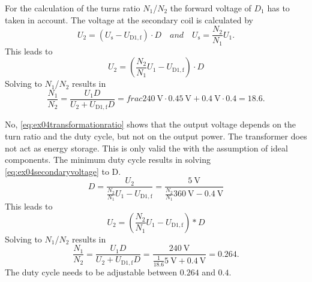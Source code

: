 \begin{solutionblock}
    For the calculation of the turns ratio $N_\mathrm{1}$/$N_\mathrm{2}$ the forward voltage of $D_\mathrm{1}$ has to taken in account.
    The voltage at the secondary coil is calculated by
    \begin{equation}
        U_\mathrm{2}=\left(U_\mathrm{s}-U_\mathrm{D1,f}\right)\cdot D \quad and \quad 
        U_\mathrm{s}=\frac{N_\mathrm{2}}{N_\mathrm{1}}U_\mathrm{1}.
        \label{eq:ex04transformationratio}        
    \end{equation}
    This leads to
    \begin{equation}
        U_\mathrm{2}=\left(\frac{N_\mathrm{2}}{N_\mathrm{1}}U_\mathrm{1}-U_\mathrm{D1,f}\right)\cdot D
        \label{eq:ex04secondaryvoltage}  
    \end{equation}
    Solving to $N_\mathrm{1}$/$N_\mathrm{2}$ results in
    \begin{equation}
        \frac{N_\mathrm{1}}{N_\mathrm{2}}=\frac{U_\mathrm{1}D}{U_\mathrm{2}+ U_\mathrm{D1,f}D}
        =frac{\SI{240}{\volt}\cdot 0.4}{\SI{5}{\volt}+\SI{0.4}{\volt} \cdot 0.4 }=18.6.
    \end{equation}
\end{solutionblock}



\begin{solutionblock}
    No, \eqref{eq:ex04transformationratio} shows that the output voltage depends on the turn ratio and the duty cycle,
    but not on the output power. The transformer does not act as energy storage. 
    This is only valid the with the assumption of ideal components. 
    The minimum duty cycle results in solving \eqref{eq:ex04secondaryvoltage} to D.
    \begin{equation}
        D=\frac{U_\mathrm{2}}{\frac{N_\mathrm{2}}{N_\mathrm{1}}U_\mathrm{1}-U_\mathrm{D1,f}}=
        \frac{\SI{5}{\volt}}{\frac{N_\mathrm{2}}{N_\mathrm{1}}\SI{360}{\volt}-\SI{0.4}{\volt}}
    \end{equation}
    This leads to
    \begin{equation}
        U_\mathrm{2}=\left(\frac{N_\mathrm{2}}{N_\mathrm{1}}U_\mathrm{1}-U_\mathrm{D1,f}\right)*D
    \end{equation}
    Solving to $N_\mathrm{1}$/$N_\mathrm{2}$ results in
    \begin{equation}
        \frac{N_\mathrm{1}}{N_\mathrm{2}}=\frac{U_\mathrm{1}D}{U_\mathrm{2}+ U_\mathrm{D1,f}D}
        =\frac{\SI{240}{\volt}}{\frac{1}{18.6} \SI{5}{\volt}+\SI{0.4}{\volt}}=0.264.
    \end{equation}
    The duty cycle needs to be adjustable between $0.264$ and $0.4$.
\end{solutionblock}
         
